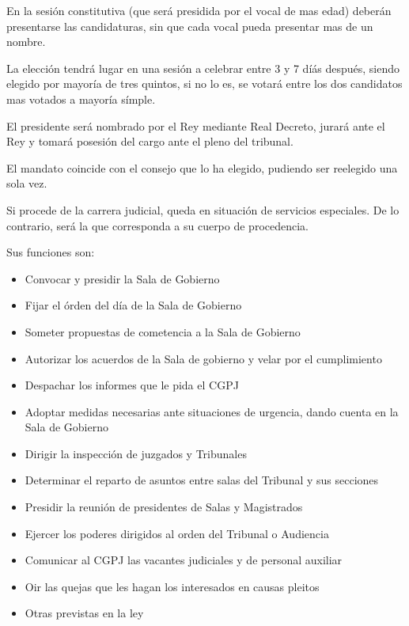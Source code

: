         En la sesión constitutiva (que será presidida por el vocal de mas edad) deberán presentarse las candidaturas, sin que cada vocal pueda presentar mas de un nombre.

        La elección tendrá lugar en una sesión a celebrar entre 3 y 7 díás después, siendo elegido por mayoría de tres quintos, si no lo es, se votará entre los dos candidatos mas votados a mayoría símple.

        El presidente será nombrado por el Rey mediante Real Decreto, jurará ante el Rey y tomará posesión del cargo ante el pleno del tribunal.

        El mandato coincide con el consejo que lo ha elegido, pudiendo ser reelegido una sola vez.

        Si procede de la carrera judicial, queda en situación de servicios especiales. De lo contrario, será la que corresponda a su cuerpo de procedencia.

        Sus funciones son:
        \begin{itemize}
            \item Convocar y presidir la Sala de Gobierno
            \item Fijar el órden del día de la Sala de Gobierno
            \item Someter propuestas de cometencia a la Sala de Gobierno
            \item Autorizar los acuerdos de la Sala de gobierno y velar por el cumplimiento
            \item Despachar los informes que le pida el CGPJ
            \item Adoptar medidas necesarias ante situaciones de urgencia, dando cuenta en la Sala de Gobierno
            \item Dirigir la inspección de juzgados y Tribunales
            \item Determinar el reparto de asuntos entre salas del Tribunal y sus secciones
            \item Presidir la reunión de presidentes de Salas y Magistrados
            \item Ejercer los poderes dirigidos al orden del Tribunal o Audiencia
            \item Comunicar al CGPJ las vacantes judiciales y de personal auxiliar
            \item Oir las quejas que les hagan los interesados en causas pleitos
            \item Otras previstas en la ley
        \end{itemize}

